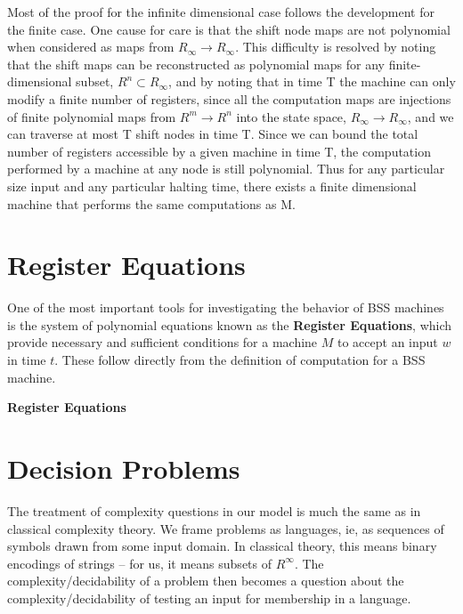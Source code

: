   \begin{proofsketch}
    
    Most of the proof for the infinite dimensional case follows the
    development for the finite case.  One cause for care is that the
    shift node maps are not polynomial when considered as maps from
    $R_\infty \rightarrow R_\infty$.  This difficulty is resolved by
    noting that the shift maps can be reconstructed as polynomial maps
    for any finite-dimensional subset, $R^n \subset R_\infty$, and by
    noting that in time T the machine can only modify a finite number
    of registers, since all the computation maps are injections of
    finite polynomial maps from $R^m \rightarrow R^n$ into the state
    space, $R_\infty \rightarrow R_\infty$, and we can traverse at
    most T shift nodes in time T.  Since we can bound the total number
    of registers accessible by a given machine in time T, the
    computation performed by a machine at any node is still
    polynomial. Thus for any particular size input and any particular
    halting time, there exists a finite dimensional machine that
    performs the same computations as M.
    
  \end{proofsketch}

  \section{Register Equations}

  One of the most important tools for investigating the behavior of
  BSS machines is the system of polynomial equations known as the
  \textbf{Register Equations}, which provide necessary and sufficient
  conditions for a machine $M$ to accept an input $w$ in time $t$.
  These follow directly from the definition of computation for a BSS
  machine. 

  \begin{definition}{\textbf{Register Equations}}
  \end{definition}
  
  \section{Decision Problems}

  The treatment of complexity questions in our model is much the same
  as in classical complexity theory.  We frame problems as languages,
  ie, as sequences of symbols drawn from some input domain.  In
  classical theory, this means binary encodings of strings -- for us,
  it means subsets of $R^\infty$.  The complexity/decidability of a
  problem then becomes a question about the complexity/decidability of
  testing an input for membership in a language.

